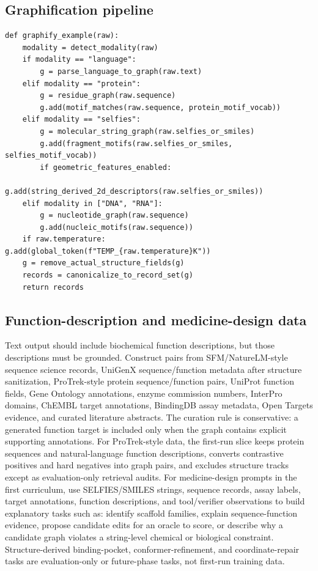 \documentclass[11pt]{article}
\newcommand{\1}{\mathbf{1}}
\begin{document}
\subsection{Graphification pipeline}

\begin{lstlisting}[caption={End-to-end data graphification.}]
def graphify_example(raw):
    modality = detect_modality(raw)
    if modality == "language":
        g = parse_language_to_graph(raw.text)
    elif modality == "protein":
        g = residue_graph(raw.sequence)
        g.add(motif_matches(raw.sequence, protein_motif_vocab))
    elif modality == "selfies":
        g = molecular_string_graph(raw.selfies_or_smiles)
        g.add(fragment_motifs(raw.selfies_or_smiles, selfies_motif_vocab))
        if geometric_features_enabled:
            g.add(string_derived_2d_descriptors(raw.selfies_or_smiles))
    elif modality in ["DNA", "RNA"]:
        g = nucleotide_graph(raw.sequence)
        g.add(nucleic_motifs(raw.sequence))
    if raw.temperature: g.add(global_token(f"TEMP_{raw.temperature}K"))
    g = remove_actual_structure_fields(g)
    records = canonicalize_to_record_set(g)
    return records
\end{lstlisting}

\subsection{Function-description and medicine-design data}

Text output should include biochemical function descriptions, but those descriptions must be grounded. Construct pairs from SFM/NatureLM-style sequence science records, UniGenX sequence/function metadata after structure sanitization, ProTrek-style protein sequence/function pairs, UniProt function fields, Gene Ontology annotations, enzyme commission numbers, InterPro domains, ChEMBL target annotations, BindingDB assay metadata, Open Targets evidence, and curated literature abstracts. The curation rule is conservative: a generated function target is included only when the graph contains explicit supporting annotations. For ProTrek-style data, the first-run slice keeps protein sequences and natural-language function descriptions, converts contrastive positives and hard negatives into graph pairs, and excludes structure tracks except as evaluation-only retrieval audits. For medicine-design prompts in the first curriculum, use SELFIES/SMILES strings, sequence records, assay labels, target annotations, function descriptions, and tool/verifier observations to build explanatory tasks such as: identify scaffold families, explain sequence-function evidence, propose candidate edits for an oracle to score, or describe why a candidate graph violates a string-level chemical or biological constraint. Structure-derived binding-pocket, conformer-refinement, and coordinate-repair tasks are evaluation-only or future-phase tasks, not first-run training data.
\end{document}
